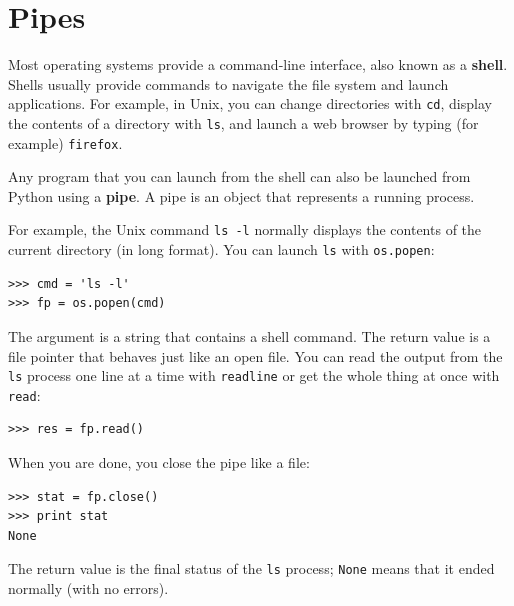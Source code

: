 \section{Pipes}


Most operating systems provide a command-line interface,
also known as a {\bf shell}.  Shells usually provide commands
to navigate the file system and launch applications.  For
example, in Unix, you can change directories with {\tt cd},
display the contents of a directory with {\tt ls}, and launch
a web browser by typing (for example) {\tt firefox}.


Any program that you can launch from the shell can also be
launched from Python using a {\bf pipe}.  A pipe is an object
that represents a running process.

For example, the Unix command {\tt ls -l} normally displays the
contents of the current directory (in long format).  You can
launch {\tt ls} with {\tt os.popen}:


\beforeverb
\begin{verbatim}
>>> cmd = 'ls -l'
>>> fp = os.popen(cmd)
\end{verbatim}
\afterverb
%
The argument is a string that contains a shell command.  The
return value is a file pointer that behaves just like an open
file.  You can read the output from the {\tt ls} process one
line at a time with {\tt readline} or get the whole thing at
once with {\tt read}:


\beforeverb
\begin{verbatim}
>>> res = fp.read()
\end{verbatim}
\afterverb
%
When you are done, you close the pipe like a file:


\beforeverb
\begin{verbatim}
>>> stat = fp.close()
>>> print stat
None
\end{verbatim}
\afterverb
%
The return value is the final status of the {\tt ls} process;
{\tt None} means that it ended normally (with no errors).


